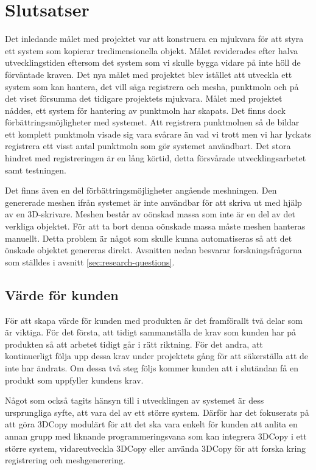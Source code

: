 \chapter{Slutsatser}
\label{cha:conclusion}
Det inledande målet med projektet var att konstruera en mjukvara för att styra ett system som kopierar tredimensionella objekt. Målet reviderades efter halva utvecklingstiden eftersom det system som vi skulle bygga vidare på inte höll de förväntade kraven. Det nya målet med projektet blev istället att utveckla ett system som kan hantera, det vill säga registrera och mesha, punktmoln och på det viset försumma det tidigare projektets mjukvara. Målet med projektet nåddes, ett system för hantering av punktmoln har skapats. Det finns dock förbättringsmöjligheter med systemet. Att registrera punktmolnen så de bildar ett komplett punktmoln visade sig vara svårare än vad vi trott men vi har lyckats registrera ett visst antal punktmoln som gör systemet användbart. Det stora hindret med registreringen är en lång körtid, detta försvårade utvecklingsarbetet samt testningen.

Det finns även en del förbättringsmöjligheter angående meshningen. Den genererade meshen ifrån systemet är inte användbar för att skriva ut med hjälp av en 3D-skrivare. Meshen består av oönskad massa som inte är en del av det verkliga objektet. För att ta bort denna oönskade massa måste meshen hanteras manuellt. Detta problem är något som skulle kunna automatiseras så att det önskade objektet genereras direkt. Avsnitten nedan besvarar forskningsfrågorna som ställdes i avsnitt \ref{sec:research-questions}.

\section{Värde för kunden}

För att skapa värde för kunden med produkten är det framförallt två delar som är viktiga. För det första, att tidigt sammanställa de krav som kunden har på produkten så att arbetet tidigt går i rätt riktning. För det andra, att kontinuerligt följa upp dessa krav under projektets gång för att säkerställa att de inte har ändrats. Om dessa två steg följs kommer kunden att i slutändan få en produkt som uppfyller kundens krav.

Något som också tagits hänsyn till i utvecklingen av systemet är dess ursprungliga syfte, att vara del av ett större system. Därför har det fokuserats på att göra 3DCopy modulärt för att det ska vara enkelt för kunden att anlita en annan grupp med liknande programmeringsvana som kan integrera 3DCopy i ett större system, vidareutveckla 3DCopy eller använda 3DCopy för att forska kring registrering och meshgenerering.

